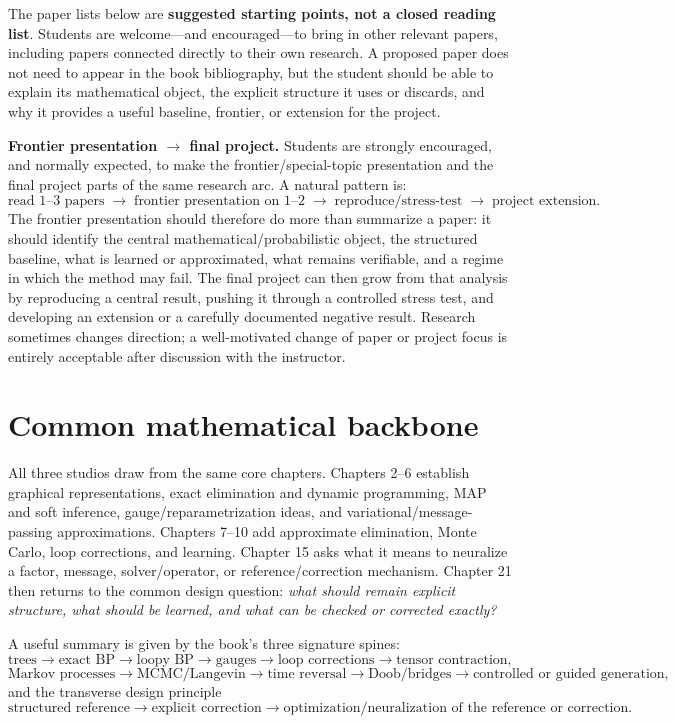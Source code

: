 \documentclass[11pt]{article}
\begin{document}
The paper lists below are \textbf{suggested starting points, not a closed reading list}. Students are welcome---and encouraged---to bring in other relevant papers, including papers connected directly to their own research. A proposed paper does not need to appear in the book bibliography, but the student should be able to explain its mathematical object, the explicit structure it uses or discards, and why it provides a useful baseline, frontier, or extension for the project.

\textbf{Frontier presentation $\longrightarrow$ final project.} Students are strongly encouraged, and normally expected, to make the frontier/special-topic presentation and the final project parts of the same research arc. A natural pattern is:
\[
\boxed{\text{read 1--3 papers}\;\longrightarrow\;\text{frontier presentation on 1--2}\;\longrightarrow\;\text{reproduce/stress-test}\;\longrightarrow\;\text{project extension}.}
\]
The frontier presentation should therefore do more than summarize a paper: it should identify the central mathematical/probabilistic object, the structured baseline, what is learned or approximated, what remains verifiable, and a regime in which the method may fail. The final project can then grow from that analysis by reproducing a central result, pushing it through a controlled stress test, and developing an extension or a carefully documented negative result. Research sometimes changes direction; a well-motivated change of paper or project focus is entirely acceptable after discussion with the instructor.

\section*{Common mathematical backbone}

All three studios draw from the same core chapters. Chapters 2--6 establish graphical representations, exact elimination and dynamic programming, MAP and soft inference, gauge/reparametrization ideas, and variational/message-passing approximations. Chapters 7--10 add approximate elimination, Monte Carlo, loop corrections, and learning. Chapter 15 asks what it means to neuralize a factor, message, solver/operator, or reference/correction mechanism. Chapter 21 then returns to the common design question: \emph{what should remain explicit structure, what should be learned, and what can be checked or corrected exactly?}

A useful summary is given by the book's three signature spines:
\[
\text{trees}\to\text{exact BP}\to\text{loopy BP}\to
\text{gauges}\to\text{loop corrections}\to\text{tensor contraction},
\]
\[
\text{Markov processes}\to\text{MCMC/Langevin}\to\text{time reversal}\to
\text{Doob/bridges}\to\text{controlled or guided generation},
\]
and the transverse design principle
\[
\boxed{\text{structured reference}\to\text{explicit correction}\to
\text{optimization/neuralization of the reference or correction}.}
\]
\end{document}
